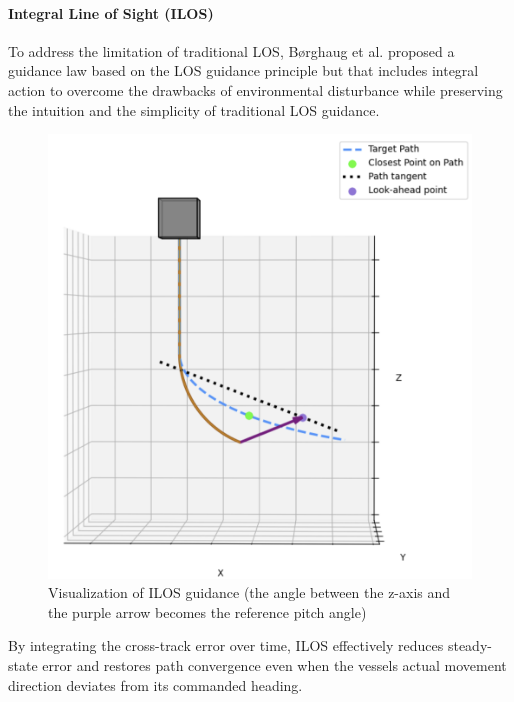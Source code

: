 \paragraph*{Integral Line of Sight (ILOS)}
To address the limitation of traditional LOS, Børghaug et al. \cite{borhaug_integral_2008} proposed a guidance law based on the LOS guidance principle but that includes integral action to overcome the drawbacks of environmental disturbance while preserving the intuition and the simplicity of traditional LOS guidance.
\begin{figure} [H]
    \centering
    \includegraphics[width=0.7\linewidth]{images/pythonpictures/ILOS.png}
    \caption{Visualization of ILOS guidance (the angle between the z-axis and the purple arrow becomes the reference pitch angle)}
    \label{fig:ILOS}
\end{figure}
By integrating the cross-track error over time, ILOS effectively reduces steady-state error and restores path convergence even when the vessels actual movement direction deviates from its commanded heading.

